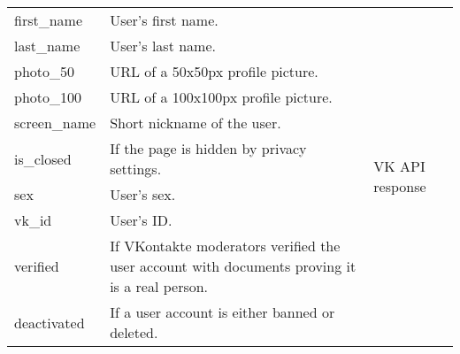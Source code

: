 \begin{table}[]
\begin{tabular}{p{3cm}p{6cm}p{5cm}}
first\_name            & User’s first name.                                                                            & \multirow{10}{*}{VK API response}                                                      \\ 
last\_name             & User’s last name.                                                                             &                                                                                        \\ 
photo\_50              & URL of a 50x50px profile picture.                                                             &                                                                                        \\ 
photo\_100             & URL of a 100x100px profile picture.                                                           &                                                                                        \\ 
screen\_name           & Short nickname of the user.                                                                   &                                                                                        \\ 
is\_closed             & If the page is hidden by privacy settings.                                                    &                                                                                        \\ 
sex                    & User’s sex.                                                                                   &                                                                                        \\ 
vk\_id                 & User’s ID.                                                                                    &                                                                                        \\ 
verified               & If VKontakte moderators verified the user account with documents proving it is a real person. &                                                                                        \\ 
deactivated            & If a user account is either banned or deleted.                                                &                                                                                        \\ \bottomrule
\end{tabular}
\end{table}
